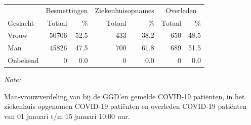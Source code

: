 \documentclass[
  english,
  man,floatsintext]{apa6}
\begin{document}
\begin{table}[H]
\centering\begingroup\fontsize{11}{13}\selectfont

\begin{threeparttable}
\begin{tabular}{lrrrrrr}
\toprule
\multicolumn{1}{c}{ } & \multicolumn{2}{c}{Besmettingen} & \multicolumn{2}{c}{Ziekenhuisopnames} & \multicolumn{2}{c}{Overleden} \\
\cmidrule(l{3pt}r{3pt}){2-3} \cmidrule(l{3pt}r{3pt}){4-5} \cmidrule(l{3pt}r{3pt}){6-7}
Geslacht & Totaal & \% & Totaal & \% & Totaal & \%\\
\midrule
Vrouw & 50706 & 52.5 & 433 & 38.2 & 650 & 48.5\\
Man & 45826 & 47.5 & 700 & 61.8 & 689 & 51.5\\
Onbekend & 0 & 0.0 & 0 & 0.0 & 0 & 0.0\\
\bottomrule
\end{tabular}
\begin{tablenotes}
\item \textit{Note: } 
\item Man-vrouwverdeling van bij de GGD’en gemelde COVID-19 patiënten, in het ziekenhuis opgenomen COVID-19 patiënten en overleden COVID-19 patiënten van 01 januari t/m 15 januari 10:00 uur.
\end{tablenotes}
\end{threeparttable}
\endgroup{}
\end{table}
\newpage
\end{document}

